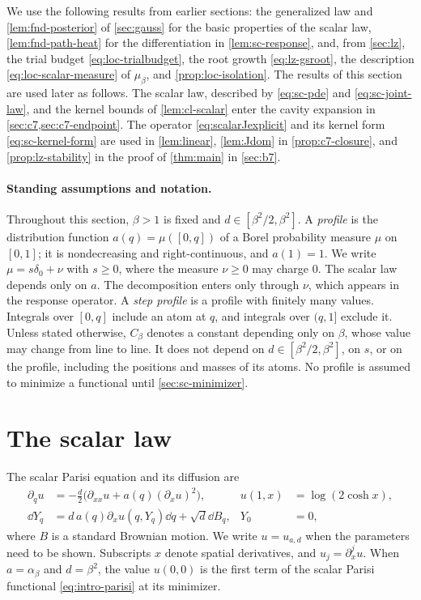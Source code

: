 We use the following results from earlier sections: the generalized
law and \cref{lem:fnd-posterior} of \cref{sec:gauss} for the basic
properties of the scalar law, \cref{lem:fnd-path-heat} for the
differentiation in \cref{lem:sc-response}, and, from \cref{sec:lz}, the
trial budget \eqref{eq:loc-trialbudget}, the root growth
\eqref{eq:lz-gsroot}, the description \eqref{eq:loc-scalar-measure} of
$\mu_\beta$, and \cref{prop:loc-isolation}. The results of this section
are used later as follows. The scalar law, described by \eqref{eq:sc-pde} and
\eqref{eq:sc-joint-law}, and the kernel bounds of \cref{lem:cl-scalar}
enter the cavity expansion in \cref{sec:c7,sec:c7-endpoint}. The
operator \eqref{eq:scalarJexplicit} and its kernel form
\eqref{eq:sc-kernel-form} are used in \cref{lem:linear}, \cref{lem:Jdom}
in \cref{prop:c7-closure}, and \cref{prop:lz-stability} in the proof of
\cref{thm:main} in \cref{sec:b7}.

\paragraph{Standing assumptions and notation.}
Throughout this section, $\beta>1$ is fixed and
$d\in[\beta^2/2,\beta^2]$. A \emph{profile} is the distribution function
$a(q)=\mu([0,q])$ of a Borel probability measure $\mu$ on $[0,1]$; it is
nondecreasing and right-continuous, and $a(1)=1$. We write
$\mu=s\delta_0+\nu$ with $s\ge0$, where the measure $\nu\ge0$ may charge
$0$. The scalar law depends only on $a$. The decomposition enters only
through $\nu$, which appears in the response operator. A \emph{step
profile} is a profile with finitely many values. Integrals over
$[0,q]$ include an atom at $q$, and integrals over $(q,1]$ exclude it.
Unless stated otherwise, $C_\beta$ denotes a constant depending only on
$\beta$, whose value may change from line to line. It does not depend
on $d\in[\beta^2/2,\beta^2]$, on $s$, or on the profile, including the
positions and masses of its atoms. No profile is assumed to minimize a
functional until \cref{sec:sc-minimizer}.

\section{The scalar law}\label{sec:sc-law}

The scalar Parisi equation and its diffusion are
\begin{equation}\label{eq:sc-pde}
 \begin{aligned}
 \partial_q u&=-\frac d2\bigl(\partial_{xx}u+a(q)(\partial_xu)^2\bigr),
 &u(1,x)&=\log(2\cosh x),\\
 \dd Y_q&=d\,a(q)\partial_xu(q,Y_q)\dd q+\sqrt d\dd B_q,
 &Y_0&=0,
 \end{aligned}
\end{equation}
where $B$ is a standard Brownian motion. We write $u=u_{a,d}$ when the
parameters need to be shown. Subscripts $x$ denote spatial derivatives,
and $u_j=\partial_x^ju$. When $a=\alpha_\beta$ and
$d=\beta^2$, the value $u(0,0)$ is the first term of the scalar Parisi
functional \eqref{eq:intro-parisi} at its minimizer.


